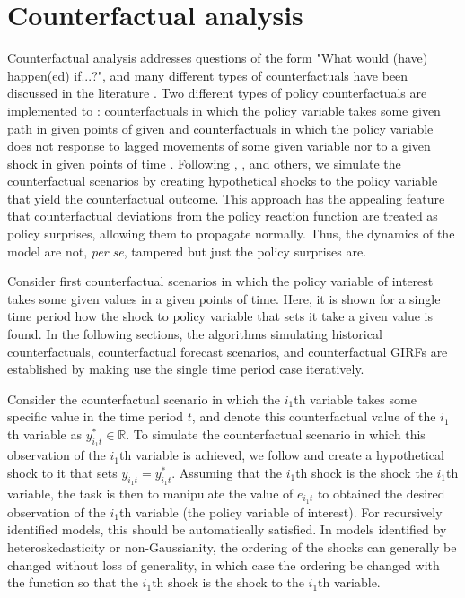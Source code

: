 \documentclass[nojss]{jss}
\begin{document}
\section{Counterfactual analysis}\label{sec:cfact}

Counterfactual analysis addresses questions of the form "What would (have) happen(ed) if...?", and many different types of counterfactuals have been discussed in the literature \citep[see, e.g.,][Chapter~4, and the references therein]{Kilian+Lutkepohl:2017}. Two different types of policy counterfactuals are implemented to : counterfactuals in which the policy variable takes some given path in given points of given \citep[e.g.,][]{Bernanke+Gertler+Watson:1997} and counterfactuals in which the policy variable does not response to lagged movements of some given variable nor to a given shock in given points of time \citep[e.g.,][consider a closely related counterfactual, where the policy variable does not response to lagged nor contemporaneous movements of some given variable]{Kilian+Lewis:2011}. Following \cite{Bernanke+Gertler+Watson:1997}, \cite{Kilian+Lewis:2011}, and others, we simulate the counterfactual scenarios by creating hypothetical shocks to the policy variable that yield the counterfactual outcome. This approach has the appealing feature that counterfactual deviations from the policy reaction function are treated as policy surprises, allowing them to propagate normally. Thus, the dynamics of the model are not, \textit{per se}, tampered but just the policy surprises are.

Consider first counterfactual scenarios in which the policy variable of interest takes some given values in a given points of time. Here, it is shown for a single time period how the shock to policy variable that sets it take a given value is found. In the following sections, the algorithms simulating historical counterfactuals, counterfactual forecast scenarios, and counterfactual GIRFs are established by making use the single time period case iteratively.

Consider the counterfactual scenario in which the $i_1$th variable takes some specific value in the time period $t$, and denote this counterfactual value of the $i_1$th variable as $y_{i_1t}^{*}\in\mathbb{R}$. To simulate the counterfactual scenario in which this observation of the $i_1$th variable is achieved, we follow \cite{Bernanke+Gertler+Watson:1997} and create a hypothetical shock to it that sets $y_{i_1t}=y_{i_1t}^{*}$. Assuming that the $i_1$th shock is the shock the $i_1$th variable, the task is then to manipulate the value of $e_{i_1t}$ to obtained the desired observation of the $i_1$th variable (the policy variable of interest). For recursively identified models, this should be automatically satisfied. In models identified by heteroskedasticity or non-Gaussianity, the ordering of the shocks can generally be changed without loss of generality, in which case the ordering be changed with the function  so that the $i_1$th shock is the shock to the $i_1$th variable.
\end{document}
